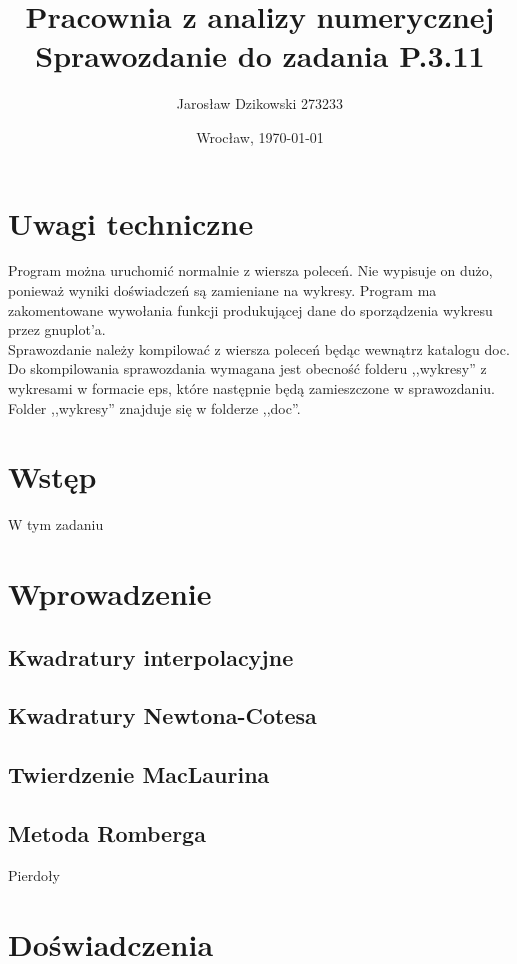 \documentclass{article}
\author{Jarosław Dzikowski 273233}
\date{Wrocław, \today}
\title{\textbf{Pracownia z analizy numerycznej} \\ Sprawozdanie do zadania \textbf{P.3.11}}
\begin{document}
\maketitle
\section{Uwagi techniczne}
Program można uruchomić normalnie z wiersza poleceń. Nie wypisuje on dużo, ponieważ wyniki doświadczeń są zamieniane na wykresy. Program ma zakomentowane wywołania funkcji produkującej dane do sporządzenia wykresu przez gnuplot'a.\\

Sprawozdanie należy kompilować z wiersza poleceń będąc wewnątrz katalogu doc.
Do skompilowania sprawozdania wymagana jest obecność folderu ,,wykresy'' z wykresami w formacie eps, które następnie będą zamieszczone w sprawozdaniu. Folder ,,wykresy'' znajduje się w folderze ,,doc''.

\section{Wstęp}
W tym zadaniu

\section{Wprowadzenie}

\subsection{Kwadratury interpolacyjne}

\subsection{Kwadratury Newtona-Cotesa}

\subsection{Twierdzenie MacLaurina}

\subsection{Metoda Romberga}
Pierdoły

\section{Doświadczenia}
\end{document}
